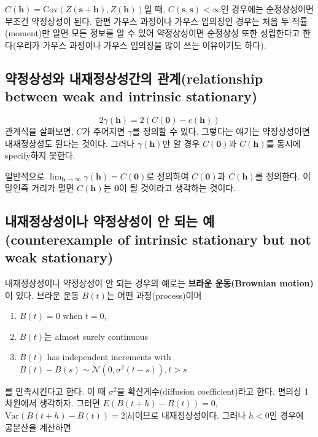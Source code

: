 \documentclass[b5paper,]{scrbook}
\providecommand{\tightlist}{%
  \setlength{\itemsep}{0pt}\setlength{\parskip}{0pt}}
\theoremstyle{plain}
\theoremstyle{definition}
\numberwithin{equation}{section}
\begin{document}
\(C(\mathbf{h})=\text{Cov}(Z(\mathbf{s}+\mathbf{h}), Z(\mathbf{h}))\)일
때, \(C(\mathbf{s},\mathbf{s}) < \infty\)인 경우에는 순정상성이면 무조건
약정상성이 된다. 한편 가우스 과정이나 가우스 임의장인 경우는 처음 두
적률(moment)만 알면 모든 정보를 알 수 있어 약정상성이면 순정상성 또한
성립한다고 한다(우리가 가우스 과정이나 가우스 임의장을 많이 쓰는
이유이기도 하다).

\subsection{약정상성와 내재정상성간의 관계(relationship between weak and
intrinsic
stationary)}\label{--relationship-between-weak-and-intrinsic-stationary}

\[2\gamma(\mathbf{h})=2(C(\mathbf{0})-c(\mathbf{h}))\] 관계식을
살펴보면, \(C\)가 주어지면 \(\gamma\)를 정의할 수 있다. 그렇다는 얘기는
약정상성이면 내재정상성도 된다는 것이다. 그러나 \(\gamma(\mathbf{h})\)만
알 경우 \(C(\mathbf{0})\)과 \(C(\mathbf{h})\)를 동시에 specify하지
못한다.

일반적으로
\(\lim_{\mathbf{h}\rightarrow \infty}\gamma(\mathbf{h})=C(\mathbf{0})\)로
정의하여 \(C(\mathbf{0})\)과 \(C(\mathbf{h})\)를 정의한다. 이 말인즉
거리가 멀면 \(C(\mathbf{h})\)는 \(\mathbf{0}\)이 될 것이라고 생각하는
것이다.

\subsection{내재정상성이나 약정상성이 안 되는 예(counterexample of
intrinsic stationary but not weak
stationary)}\label{----counterexample-of-intrinsic-stationary-but-not-weak-stationary}

내재정상성이나 약정상성이 안 되는 경우의 예로는 \textbf{브라운
운동(Brownian motion)}이 있다. 브라운 운동 \(B(t)\)는 어떤
과정(process)이며

\begin{enumerate}
\def\labelenumi{\arabic{enumi}.}
\tightlist
\item
  \(B(t)=0\) when \(t=0\),
\item
  \(B(t)\)는 almost surely continuous
\item
  \(B(t)\) has independent increments with
  \(B(t)-B(s) \sim \mathcal{N}(0,\sigma^{2}(t-s)), t>s\)
\end{enumerate}

를 만족시킨다고 한다. 이 때 \(\sigma^{2}\)을 확산계수(diffusion
coefficient)라고 한다. 편의상 1차원에서 생각하자. 그러면
\(E(B(t+h)-B(t))=0\), \(\text{Var}(B(t+h)-B(t))=2|h|\)이므로
내재정상성이다. 그러나 \(h < 0\)인 경우에 공분산을 계산하면
\end{document}
